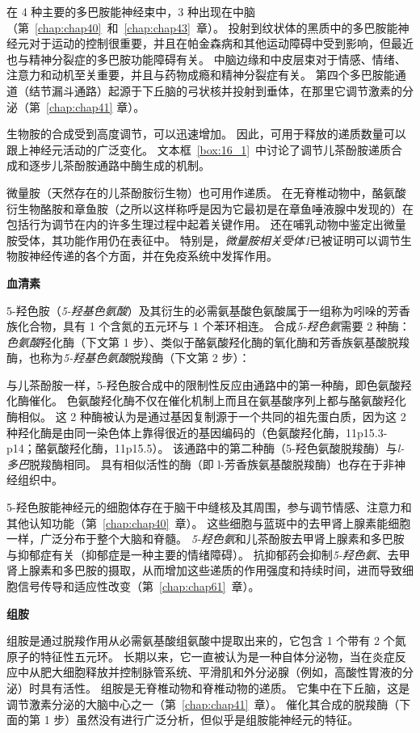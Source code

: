 在 4 种主要的多巴胺能神经束中，3 种出现在中脑（第~\ref{chap:chap40}~和~\ref{chap:chap43}~章）。
投射到纹状体的黑质中的多巴胺能神经元对于运动的控制很重要，并且在帕金森病和其他运动障碍中受到影响，但最近也与精神分裂症的多巴胺功能障碍有关。
中脑边缘和中皮层束对于情感、情绪、注意力和动机至关重要，并且与药物成瘾和精神分裂症有关。
第四个多巴胺能通道（结节漏斗通路）起源于下丘脑的弓状核并投射到垂体，在那里它调节激素的分泌（第~\ref{chap:chap41} 章）。


生物胺的合成受到高度调节，可以迅速增加。
因此，可用于释放的递质数量可以跟上神经元活动的广泛变化。
文本框~\ref{box:16_1}~中讨论了调节儿茶酚胺递质合成和逐步儿茶酚胺通路中酶生成的机制。


微量胺（天然存在的儿茶酚胺衍生物）也可用作递质。
在无脊椎动物中，酪氨酸衍生物酪胺和章鱼胺（之所以这样称呼是因为它最初是在章鱼唾液腺中发现的）在包括行为调节在内的许多生理过程中起着关键作用。
还在哺乳动物中鉴定出微量胺受体，其功能作用仍在表征中。
特别是，\textit{微量胺相关受体1}已被证明可以调节生物胺神经传递的各个方面，并在免疫系统中发挥作用。


\textbf{血清素}

5-羟色胺（\textit{5-羟基色氨酸}）及其衍生的必需氨基酸色氨酸属于一组称为吲哚的芳香族化合物，具有 1 个含氮的五元环与 1 个苯环相连。
合成\textit{5-羟色氨}需要 2 种酶：\textit{色氨酸}羟化酶（下文第 1 步）、类似于酪氨酸羟化酶的氧化酶和芳香族氨基酸脱羧酶，也称为\textit{5-羟基色氨酸}脱羧酶（下文第 2 步）：


与儿茶酚胺一样，5-羟色胺合成中的限制性反应由通路中的第一种酶，即色氨酸羟化酶催化。
色氨酸羟化酶不仅在催化机制上而且在氨基酸序列上都与酪氨酸羟化酶相似。
这 2 种酶被认为是通过基因复制源于一个共同的祖先蛋白质，因为这 2 种羟化酶是由同一染色体上靠得很近的基因编码的（色氨酸羟化酶，11p15.3-p14；酪氨酸羟化酶，11p15.5）。
该通路中的第二种酶（5-羟色氨酸脱羧酶）与\textit{l-多巴}脱羧酶相同。
具有相似活性的酶（即 l-芳香族氨基酸脱羧酶）也存在于非神经组织中。


5-羟色胺能神经元的细胞体存在于脑干中缝核及其周围，参与调节情感、注意力和其他认知功能（第~\ref{chap:chap40}~章）。
这些细胞与蓝斑中的去甲肾上腺素能细胞一样，广泛分布于整个大脑和脊髓。
\textit{5-羟色氨}和儿茶酚胺去甲肾上腺素和多巴胺与抑郁症有关（抑郁症是一种主要的情绪障碍）。
抗抑郁药会抑制\textit{5-羟色氨}、去甲肾上腺素和多巴胺的摄取，从而增加这些递质的作用强度和持续时间，进而导致细胞信号传导和适应性改变（第~\ref{chap:chap61}~章）。


\textbf{组胺}

组胺是通过脱羧作用从必需氨基酸组氨酸中提取出来的，它包含 1 个带有 2 个氮原子的特征性五元环。
长期以来，它一直被认为是一种自体分泌物，当在炎症反应中从肥大细胞释放并控制脉管系统、平滑肌和外分泌腺（例如，高酸性胃液的分泌）时具有活性。
组胺是无脊椎动物和脊椎动物的递质。
它集中在下丘脑，这是调节激素分泌的大脑中心之一（第~\ref{chap:chap41}~章）。
催化其合成的脱羧酶（下面的第 1 步）虽然没有进行广泛分析，但似乎是组胺能神经元的特征。


